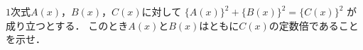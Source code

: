 \documentclass[../../main.tex]{subfiles}
\begin{document}
$1$次式$A(x)$，$B(x)$，$C(x)$に対して
$\{A(x)\}^2+\{B(x)\}^2=\{C(x)\}^2$
が成り立つとする．
このとき$A(x)$と$B(x)$はともに$C(x)$の定数倍であることを示せ．
\end{document}
